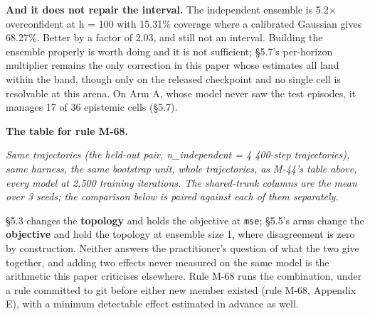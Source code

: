 \documentclass[10pt]{article}
\begin{document}
\textbf{And it does not repair the interval.} The independent ensemble is 5.2$\times$ overconfident at h = 100 with 15.31\% coverage where a calibrated Gaussian gives 68.27\%. Better by a factor of 2.03, and still not an interval. Building the ensemble properly is worth doing and it is not sufficient; \S{}5.7's per-horizon multiplier remains the only correction in this paper whose estimates all land within the band, though only on the released checkpoint and no single cell is resolvable at this arena. On Arm A, whose model never saw the test episodes, it manages 17 of 36 epistemic cells (\S{}5.7).


\textbf{The table for rule M-68.}

\begin{center}\small{}\end{center}

\emph{Same trajectories (the held-out pair, n\_independent = 4 400-step trajectories), same harness, the same bootstrap unit, whole trajectories, as M-44's table above, every model at 2,500 training iterations. The shared-trunk columns are the mean over 3 seeds; the comparison below is paired against each of them separately.}

\S{}5.3 changes the \textbf{topology} and holds the objective at \texttt{mse}; \S{}5.5's arms change the \textbf{objective} and hold the topology at ensemble size 1, where disagreement is zero by construction. Neither answers the practitioner's question of what the two give together, and adding two effects never measured on the same model is the arithmetic this paper criticises elsewhere. Rule M-68 runs the combination, under a rule committed to git before either new member existed (rule M-68, Appendix E), with a minimum detectable effect estimated in advance as well.
\end{document}
